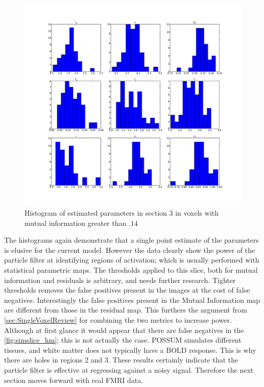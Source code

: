 \begin{figure} %
\centering
\includegraphics[clip=true,trim=2.5cm 2cm 2cm 1cm,width=15cm]{images/slicesim_hist3}
\caption{Histogram of estimated parameters in section 3 in voxels with mutual information greater
than $.14$}
\label{fig:slicesim_hist3}
\end{figure}

The histograms again demonstrate that a single point estimate of the parameters 
is elusive for the current model. However the data clearly show the power
of the particle filter at identifying regions of activation; which is usually
performed with statistical parametric maps. The thresholds applied to this
slice, both for mutual information and residuals is arbitrary, and needs further
research. Tighter thresholds removes the false positives present
in the images at the cost of false negatives. Interestingly the false 
positives present in the Mutual Information
map are different from those in the residual map. This furthers the argument from
\autoref{sec:SingleVoxelReview} for combining the two metrics to 
increase power. Although
at first glance it would appear that there are false negatives in the 
\autoref{fig:simslice_hm}; this is
not actually the case. POSSUM simulates different tissues, and white matter
does not typically  have a BOLD response. This is why there are holes in regions
2 and 3. These results certainly indicate that the particle filter is effective
at regressing against a noisy signal. Therefore the next section moves forward
with real FMRI data. 
